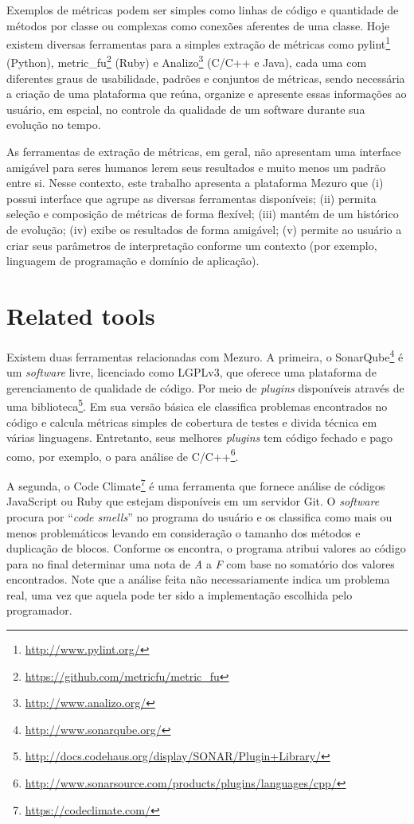 \documentclass{llncs}
\begin{document}
Exemplos de métricas podem ser simples como linhas de código e quantidade de
métodos por classe ou complexas como conexões aferentes de uma classe.  Hoje
existem diversas ferramentas para a simples extração de métricas como
pylint\footnote{\url{http://www.pylint.org/}} (Python),
metric\_fu\footnote{\url{https://github.com/metricfu/metric_fu}} (Ruby) e
Analizo\footnote{\url{http://www.analizo.org/}} (C/C++ e Java), cada uma com
diferentes graus de usabilidade, padrões e conjuntos de métricas, sendo
necessária a criação de uma plataforma que reúna, organize e apresente essas
informações ao usuário, em espcial, no controle da qualidade de um
software durante sua evolução no tempo.

As ferramentas de extração de métricas, em geral, não apresentam uma interface
amigável para seres humanos lerem seus resultados e muito menos um padrão entre
si.  Nesse contexto, este trabalho apresenta a plataforma Mezuro que
(i) possui interface que agrupe as diversas ferramentas disponíveis;
(ii) permita seleção e composição de métricas de forma flexível;
(iii) mantém de um histórico de evolução;
(iv) exibe os resultados de forma amigável;
(v) permite ao usuário a criar seus parâmetros de interpretação conforme um
contexto (por exemplo, linguagem de programação e domínio de aplicação).

\section{Related tools}

Existem duas ferramentas relacionadas com Mezuro. A primeira, o
SonarQube\footnote{\url{http://www.sonarqube.org/}} é um \textit{software}
livre, licenciado como LGPLv3, que oferece uma plataforma de gerenciamento de
qualidade de código. Por meio de \textit{plugins} disponíveis através de uma
biblioteca\footnote{\url{http://docs.codehaus.org/display/SONAR/Plugin+Library/}}.
Em sua versão básica ele classifica problemas encontrados no código e calcula
métricas simples de cobertura de testes e divida técnica em várias linguagens.
Entretanto, seus melhores \textit{plugins} tem código fechado e pago como, por
exemplo, o para análise de
C/C++\footnote{\url{http://www.sonarsource.com/products/plugins/languages/cpp/}}.

A segunda, o Code Climate\footnote{\url{https://codeclimate.com/}} é uma
ferramenta que fornece análise de códigos JavaScript ou Ruby que estejam
disponíveis em um servidor Git. O \textit{software} procura por ``\textit{code
smells}'' no programa do usuário e os classifica como mais ou menos
problemáticos levando em consideração o tamanho dos métodos e duplicação de
blocos. Conforme os encontra, o programa atribui valores ao código para no
final determinar uma nota de \textit{A} a \textit{F} com base no somatório dos
valores encontrados. Note que a análise feita não necessariamente indica um
problema real, uma vez que aquela pode ter sido a implementação escolhida pelo
programador.
\end{document}
